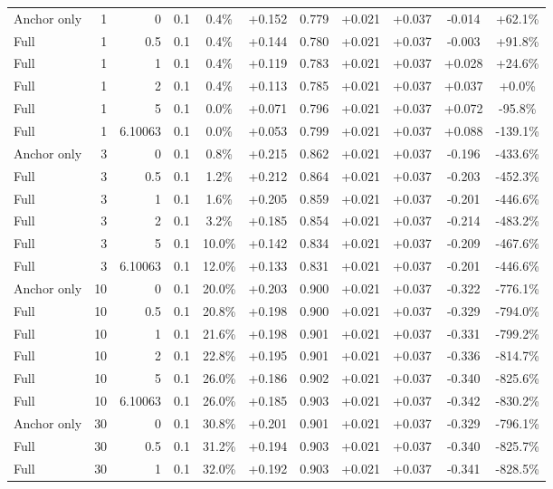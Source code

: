 \begin{table}[htbp]
\begin{tabular}{lrrrccccccc}
Anchor only & 1 & 0 & 0.1 & 0.4\% & +0.152 & 0.779 & +0.021 & +0.037 & -0.014 & +62.1\% \\
Full & 1 & 0.5 & 0.1 & 0.4\% & +0.144 & 0.780 & +0.021 & +0.037 & -0.003 & +91.8\% \\
Full & 1 & 1 & 0.1 & 0.4\% & +0.119 & 0.783 & +0.021 & +0.037 & +0.028 & +24.6\% \\
Full & 1 & 2 & 0.1 & 0.4\% & +0.113 & 0.785 & +0.021 & +0.037 & +0.037 & +0.0\% \\
Full & 1 & 5 & 0.1 & 0.0\% & +0.071 & 0.796 & +0.021 & +0.037 & +0.072 & -95.8\% \\
Full & 1 & 6.10063 & 0.1 & 0.0\% & +0.053 & 0.799 & +0.021 & +0.037 & +0.088 & -139.1\% \\
Anchor only & 3 & 0 & 0.1 & 0.8\% & +0.215 & 0.862 & +0.021 & +0.037 & -0.196 & -433.6\% \\
Full & 3 & 0.5 & 0.1 & 1.2\% & +0.212 & 0.864 & +0.021 & +0.037 & -0.203 & -452.3\% \\
Full & 3 & 1 & 0.1 & 1.6\% & +0.205 & 0.859 & +0.021 & +0.037 & -0.201 & -446.6\% \\
Full & 3 & 2 & 0.1 & 3.2\% & +0.185 & 0.854 & +0.021 & +0.037 & -0.214 & -483.2\% \\
Full & 3 & 5 & 0.1 & 10.0\% & +0.142 & 0.834 & +0.021 & +0.037 & -0.209 & -467.6\% \\
Full & 3 & 6.10063 & 0.1 & 12.0\% & +0.133 & 0.831 & +0.021 & +0.037 & -0.201 & -446.6\% \\
Anchor only & 10 & 0 & 0.1 & 20.0\% & +0.203 & 0.900 & +0.021 & +0.037 & -0.322 & -776.1\% \\
Full & 10 & 0.5 & 0.1 & 20.8\% & +0.198 & 0.900 & +0.021 & +0.037 & -0.329 & -794.0\% \\
Full & 10 & 1 & 0.1 & 21.6\% & +0.198 & 0.901 & +0.021 & +0.037 & -0.331 & -799.2\% \\
Full & 10 & 2 & 0.1 & 22.8\% & +0.195 & 0.901 & +0.021 & +0.037 & -0.336 & -814.7\% \\
Full & 10 & 5 & 0.1 & 26.0\% & +0.186 & 0.902 & +0.021 & +0.037 & -0.340 & -825.6\% \\
Full & 10 & 6.10063 & 0.1 & 26.0\% & +0.185 & 0.903 & +0.021 & +0.037 & -0.342 & -830.2\% \\
Anchor only & 30 & 0 & 0.1 & 30.8\% & +0.201 & 0.901 & +0.021 & +0.037 & -0.329 & -796.1\% \\
Full & 30 & 0.5 & 0.1 & 31.2\% & +0.194 & 0.903 & +0.021 & +0.037 & -0.340 & -825.7\% \\
Full & 30 & 1 & 0.1 & 32.0\% & +0.192 & 0.903 & +0.021 & +0.037 & -0.341 & -828.5\% \\

\end{tabular}
\end{table}
